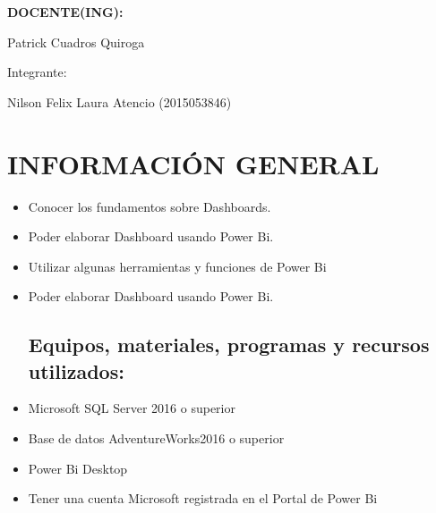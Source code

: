 \documentclass[12pt,letterpaper]{article}
\begin{document}
\begin{titlepage}
\begin{center}
\vspace*{0.3in}
\begin{Large}
\textbf{DOCENTE(ING):} \\
\end{Large}

\vspace*{0.1in}
\begin{large}
 Patrick Cuadros Quiroga\\
\end{large}

\vspace*{0.2in}
\vspace*{0.1in}
\begin{large}
Integrante: \\
\begin{flushleft}
Nilson Felix Laura Atencio	\hfill	(2015053846) 
\end{flushleft}
\end{large}
\end{center}

\end{titlepage}



\thispagestyle{empty} %
\newpage
\setcounter{page}{1} %

\section{INFORMACIÓN GENERAL}
	\begin{itemize}
\subsection{Objetivos:}
	\item Conocer los fundamentos sobre Dashboards.
	\item Poder elaborar Dashboard usando Power Bi.
	\item	Utilizar algunas herramientas y funciones de Power Bi
\item	Poder elaborar Dashboard usando Power Bi.

\subsection{Equipos, materiales, programas y recursos utilizados:}
	\item Microsoft SQL Server 2016 o superior
	\item Base de datos AdventureWorks2016 o superior
	\item Power Bi Desktop
	\item Tener una cuenta Microsoft registrada en el Portal de Power Bi
\end{itemize}
\end{document}
